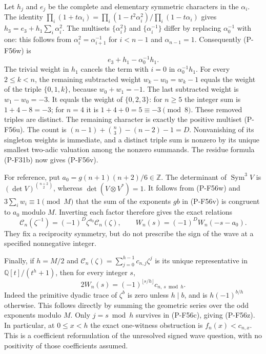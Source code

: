 \documentclass[11pt,a4paper]{article}
\begin{document}
Let $h_j$ and $e_j$ be the complete and elementary symmetric
characters in the $\alpha_i$.
The identity
$\prod_i(1+t\alpha_i)=
 \prod_i(1-t^2\alpha_i^2)/\prod_i(1-t\alpha_i)$
gives $h_3=e_3+h_1\sum_i\alpha_i^2$.
The multisets $\{\alpha_i^2\}$ and $\{\alpha_i^{-1}\}$
differ by replacing $\alpha_0^{-1}$ with one: this follows
from $\alpha_i^2=\alpha_{i+1}^{-1}$ for $i<n-1$
and $\alpha_{n-1}=1$.
Consequently (P-F56w) is
\[
                       e_3+h_1-\alpha_0^{-1}h_1.
 \tag{P-F56x}
\]
The trivial weight in $h_1$ cancels the term with $i=0$
in $\alpha_0^{-1}h_1$.
For every $2\le k<n$, the remaining subtracted weight
$w_k-w_0=w_k-1$ equals the weight of the triple
$\{0,1,k\}$, because $w_0+w_1=-1$.
The last subtracted weight is $w_1-w_0=-3$.
It equals the weight of $\{0,2,3\}$:
for $n\ge5$ the integer sum is $1+4-8=-3$;
for $n=4$ it is $1+4+0=5\equiv-3\pmod8$.
These removed triples are distinct.
The remaining character is exactly the positive multiset
(P-F56u). The count is
$(n-1)+\binom n3-(n-2)-1=D$.
Nonvanishing of its singleton weights is immediate, and
a distinct triple sum is nonzero by its unique smallest
two-adic valuation among the nonzero summands.
The residue formula (P-F31b) now gives (P-F56v).

For reference, put
$a_0=g(n+1)(n+2)/6\in\mathbb Z$.
The determinant of $\operatorname{Sym}^3 V$ is
$(\det V)^{\binom{n+2}2}$, whereas
$\det(V\otimes V^*)=1$.
It follows from (P-F56w) and $3\sum_i w_i\equiv1\pmod M$
that the sum of the exponents $gb$ in (P-F56v) is congruent
to $a_0$ modulo $M$.
Inverting each factor therefore gives the exact relations
\[
 \mathcal C_n(\zeta^{-1})
       =(-1)^D\zeta^{a_0}\mathcal C_n(\zeta),
 \qquad
 W_n(s)=(-1)^D W_n(-s-a_0).
 \tag{P-F56y}
\]
They fix a reciprocity symmetry, but do not prescribe the sign
of the wave at a specified nonnegative integer.

Finally, if $h=M/2$ and
$\mathcal C_n(\zeta)=\sum_{j=0}^{h-1}c_{n,j}\zeta^j$
is its unique representative in
$\mathbb Q[t]/(t^h+1)$, then for every integer $s$,
\[
             2W_n(s)=
       (-1)^{\lfloor s/h\rfloor}c_{n,\,s\bmod h}.
 \tag{P-F56z}
\]
Indeed the primitive dyadic trace of $\zeta^b$ is zero unless
$h\mid b$, and is $h(-1)^{b/h}$ otherwise. This follows
directly by summing the geometric series over the odd
exponents modulo $M$.
Only $j=s\bmod h$ survives in (P-F56c), giving (P-F56z).
In particular, at $0\le x<h$ the exact one-witness
obstruction is $f_n(x)<c_{n,x}$.
This is a coefficient reformulation of the unresolved signed
wave question, with no positivity of those coefficients assumed.
\end{document}
